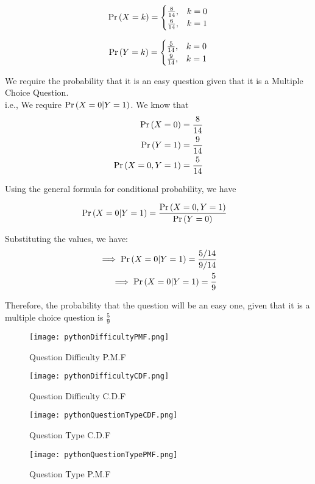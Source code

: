 \documentclass[journal,12pt,twocolumn]{IEEEtran}
\begin{document}
\begin{equation}
    \Pr\left(X = k\right) = 
      \begin{cases}
      \frac{8}{14}, & k = 0 \\
      \frac{6}{14}, & k = 1 
      \end{cases}
\end{equation}

\begin{equation}
    \Pr\left(Y = k\right) = 
      \begin{cases}
      \frac{5}{14}, & k = 0 \\
      \frac{9}{14}, & k = 1 
      \end{cases}
\end{equation}

We require the probability that it is an easy question given that it is a Multiple Choice Question.\\
i.e., We require $\Pr\left(X = 0 | Y = 1\right)$. We know that
\begin{align}
    \Pr\left(X = 0\right) = \frac{8}{14}\\
    \Pr\left(Y = 1\right) = \frac{9}{14}\\
   \Pr\left(X = 0, Y = 1\right) = \frac{5}{14}
\end{align}


Using the general formula for conditional probability, we have 

\begin{align}
    &\Pr\left(X = 0 | Y = 1\right) = \frac{\Pr\left(X = 0, Y = 1\right)}{\Pr\left(Y = 0\right)}&
\end{align}

Substituting the values, we have:
\begin{align}
    \implies \Pr\left(X = 0 | Y = 1\right) = \frac{5/14}{9/14}\\
    \implies \Pr\left(X = 0 | Y = 1\right) = \frac{5}{9}
\end{align}

Therefore, the probability that the question will be an easy one, given that it is a multiple choice question is $\displaystyle\frac{5}{9}$

\begin{figure}[!ht]
       \centering
       \texttt{[image: pythonDifficultyPMF.png]}
       \label{fig:Question Difficulty PMF}
       \caption{Question Difficulty P.M.F}
\end{figure}

\begin{figure}[!ht]
       \centering
       \texttt{[image: pythonDifficultyCDF.png]}
       \caption{Question Difficulty C.D.F}
       \label{fig:Question Difficulty CDF}
\end{figure}

\begin{figure}[!ht]
       \centering
       \texttt{[image: pythonQuestionTypeCDF.png]}
       \caption{Question Type C.D.F}
       \label{fig:Question Type CDF}
\end{figure}

\begin{figure}[!ht]
       \centering
       \texttt{[image: pythonQuestionTypePMF.png]}
       \caption{Question Type P.M.F}
       \label{fig:Question Type PMF}
\end{figure}
\end{document}
